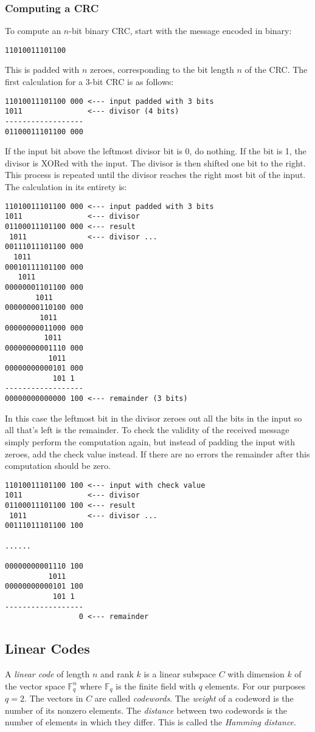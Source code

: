 \documentclass{article}
\begin{document}
\subsubsection{Computing a CRC}
To compute an $n$-bit binary CRC, start with the message encoded in binary:
\begin{verbatim}
11010011101100
\end{verbatim}
This is padded with $n$ zeroes, corresponding to the bit length $n$ of the CRC. The first calculation for a 3-bit CRC is as follows:
\begin{verbatim}
11010011101100 000 <--- input padded with 3 bits
1011               <--- divisor (4 bits) 
------------------
01100011101100 000
\end{verbatim}
If the input bit above the leftmost divisor bit is 0, do nothing. If the bit is 1, the divisor is XORed with the input. The divisor is then shifted one bit to the right. This process is repeated until the divisor reaches the right most bit of the input. The calculation in its entirety is:
\begin{verbatim}
11010011101100 000 <--- input padded with 3 bits
1011               <--- divisor
01100011101100 000 <--- result
 1011              <--- divisor ...
00111011101100 000
  1011
00010111101100 000
   1011
00000001101100 000
       1011
00000000110100 000
        1011
00000000011000 000
         1011
00000000001110 000
          1011
00000000000101 000
           101 1
------------------
00000000000000 100 <--- remainder (3 bits)
\end{verbatim}

In this case the leftmost bit in the divisor zeroes out all the bits in the input so all that's left is the remainder. To check the validity of the received message simply perform the computation again, but instead of padding the input with zeroes, add the check value instead. If there are no errors the remainder after this computation should be zero.
\begin{verbatim}
11010011101100 100 <--- input with check value
1011               <--- divisor
01100011101100 100 <--- result
 1011              <--- divisor ...
00111011101100 100

......
  
00000000001110 100
          1011
00000000000101 100 
           101 1
------------------
                 0 <--- remainder
\end{verbatim}

\subsection{Linear Codes}
A \textit{linear code} of length $n$ and rank $k$ is a linear subspace $C$ with dimension $k$ of the vector space $\mathbb{F}^{n}_{q}$ where $\mathbb{F}_{q}$ is the finite field with $q$ elements. For our purposes $q = 2$. The vectors in $C$ are called \textit{codewords}. The \textit{weight} of a codeword is the number of its nonzero elements. The \textit{distance} between two codewords is the number of elements in which they differ. This is called the \textit{Hamming distance}.
\end{document}

